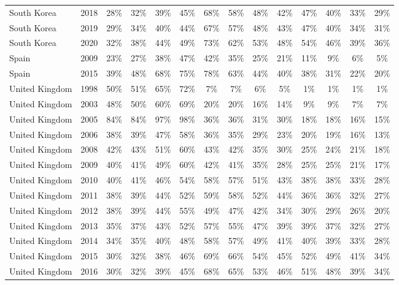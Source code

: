 \begin{ThreePartTable}
\begin{longtable}[t]{lccccccccccccc}
South Korea & 2018 & 28\% & 32\% & 39\% & 45\% & 68\% & 58\% & 48\% & 42\% & 47\% & 40\% & 33\% & 29\%\\
South Korea & 2019 & 29\% & 34\% & 40\% & 44\% & 67\% & 57\% & 48\% & 43\% & 47\% & 40\% & 34\% & 31\%\\
South Korea & 2020 & 32\% & 38\% & 44\% & 49\% & 73\% & 62\% & 53\% & 48\% & 54\% & 46\% & 39\% & 36\%\\
\addlinespace
Spain & 2009 & 23\% & 27\% & 38\% & 47\% & 42\% & 35\% & 25\% & 21\% & 11\% & 9\% & 6\% & 5\%\\
Spain & 2015 & 39\% & 48\% & 68\% & 75\% & 78\% & 63\% & 44\% & 40\% & 38\% & 31\% & 22\% & 20\%\\
\addlinespace
United Kingdom & 1998 & 50\% & 51\% & 65\% & 72\% & 7\% & 7\% & 6\% & 5\% & 1\% & 1\% & 1\% & 1\%\\
United Kingdom & 2003 & 48\% & 50\% & 60\% & 69\% & 20\% & 20\% & 16\% & 14\% & 9\% & 9\% & 7\% & 7\%\\
United Kingdom & 2005 & 84\% & 84\% & 97\% & 98\% & 36\% & 36\% & 31\% & 30\% & 18\% & 18\% & 16\% & 15\%\\
United Kingdom & 2006 & 38\% & 39\% & 47\% & 58\% & 36\% & 35\% & 29\% & 23\% & 20\% & 19\% & 16\% & 13\%\\
United Kingdom & 2008 & 42\% & 43\% & 51\% & 60\% & 43\% & 42\% & 35\% & 30\% & 25\% & 24\% & 21\% & 18\%\\
United Kingdom & 2009 & 40\% & 41\% & 49\% & 60\% & 42\% & 41\% & 35\% & 28\% & 25\% & 25\% & 21\% & 17\%\\
United Kingdom & 2010 & 40\% & 41\% & 46\% & 54\% & 58\% & 57\% & 51\% & 43\% & 38\% & 38\% & 33\% & 28\%\\
United Kingdom & 2011 & 38\% & 39\% & 44\% & 52\% & 59\% & 58\% & 52\% & 44\% & 36\% & 36\% & 32\% & 27\%\\
United Kingdom & 2012 & 38\% & 39\% & 44\% & 55\% & 49\% & 47\% & 42\% & 34\% & 30\% & 29\% & 26\% & 20\%\\
United Kingdom & 2013 & 35\% & 37\% & 43\% & 52\% & 57\% & 55\% & 47\% & 39\% & 39\% & 37\% & 32\% & 27\%\\
United Kingdom & 2014 & 34\% & 35\% & 40\% & 48\% & 58\% & 57\% & 49\% & 41\% & 40\% & 39\% & 33\% & 28\%\\
United Kingdom & 2015 & 30\% & 32\% & 38\% & 46\% & 69\% & 66\% & 54\% & 45\% & 52\% & 49\% & 41\% & 34\%\\
United Kingdom & 2016 & 30\% & 32\% & 39\% & 45\% & 68\% & 65\% & 53\% & 46\% & 51\% & 48\% & 39\% & 34\%\\

\end{longtable}
\end{ThreePartTable}
